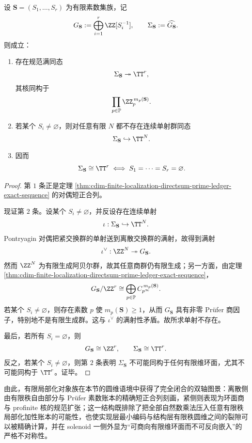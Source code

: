\begin{theorem}\label{thm:cdim-finite-localization-solenoid-quotient-embedding-rigidity}
设 \(\mathbf S=(S_1,\dots,S_r)\) 为有限素数集族，记
\[
G_{\mathbf S}:=\bigoplus_{i=1}^{r}\ZZ[S_i^{-1}],
\qquad
\Sigma_{\mathbf S}:=\widehat{G_{\mathbf S}}.
\]
则成立：
\begin{enumerate}
  \item 存在规范满同态
  \[
  \Sigma_{\mathbf S}\twoheadrightarrow \TT^r,
  \]
  其核同构于
  \[
  \prod_{p\in\mathbb P}\ZZ_p^{\,m_p(\mathbf S)}.
  \]
  \item 若某个 \(S_i\neq\varnothing\)，则对任意有限 \(N\) 都不存在连续单射群同态
  \[
  \Sigma_{\mathbf S}\hookrightarrow \TT^N.
  \]
  \item 因而
  \[
  \Sigma_{\mathbf S}\cong \TT^r
  \iff
  S_1=\cdots=S_r=\varnothing.
  \]
\end{enumerate}
\end{theorem}
\begin{proof}
第 \(1\) 条正是定理 \ref{thm:cdim-finite-localization-directsum-prime-ledger-exact-sequence} 的对偶短正合列。

现证第 \(2\) 条。设某个 \(S_i\neq\varnothing\)，并反设存在连续单射
\[
\iota:\Sigma_{\mathbf S}\hookrightarrow \TT^N.
\]
Pontryagin 对偶把紧交换群的单射送到离散交换群的满射，故得到满射
\[
\iota^\vee:\ZZ^N\twoheadrightarrow G_{\mathbf S}.
\]
然而 \(\ZZ^N\) 为有限生成阿贝尔群，故其任意商群仍有限生成；另一方面，由定理
\ref{thm:cdim-finite-localization-directsum-prime-ledger-exact-sequence}，
\[
G_{\mathbf S}/\ZZ^r
\cong
\bigoplus_{p\in\mathbb P}C_{p^\infty}^{\,m_p(\mathbf S)}.
\]
若某个 \(S_i\neq\varnothing\)，则存在素数 \(p\) 使 \(m_p(\mathbf S)\ge 1\)，从而 \(G_{\mathbf S}\) 具有非零 Prüfer 商因子，特别地不是有限生成群。这与 \(\iota^\vee\) 的满射性矛盾。故所求单射不存在。

最后，若所有 \(S_i=\varnothing\)，则
\[
G_{\mathbf S}\cong \ZZ^r,
\qquad
\Sigma_{\mathbf S}\cong \TT^r.
\]
反之，若某个 \(S_i\neq\varnothing\)，则第 \(2\) 条表明 \(\Sigma_{\mathbf S}\) 不可能同构于任何有限维环面，尤其不可能同构于 \(\TT^r\)。证毕。
\end{proof}

\noindent
由此，有限局部化对象族在本节的圆维语境中获得了完全闭合的双轴图景：离散侧由有限秩自由部分与 Prüfer 素数账本的精确短正合列刻画，紧侧则表现为环面商与 profinite 核的规范扩张；这一结构既排除了把全部自然数乘法压入任意有限秩局部化加性账本的可能性，也使实现层最小编码与结构层有限秩圆维之间的裂隙可以被精确计算，并在 solenoid 一侧外显为“可商向有限维环面而不可反向嵌入”的严格不对称性。

\endinput
